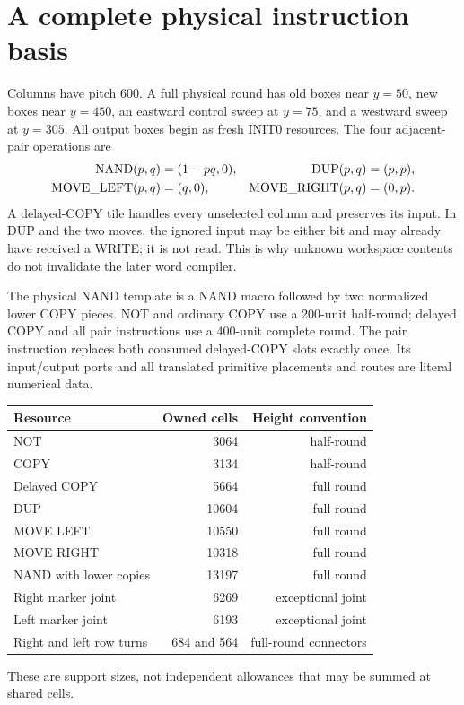 \documentclass[11pt,letterpaper]{article}
\theoremstyle{definition}\newtheorem{definition}[theorem]{Definition}
\theoremstyle{remark}\newtheorem{remark}[theorem]{Remark}
\newcommand{\DUP}{\operatorname{DUP}}\newcommand{\ML}{\operatorname{MOVE\_LEFT}}
\newcommand{\MR}{\operatorname{MOVE\_RIGHT}}\newcommand{\COPY}{\operatorname{COPY}}
\begin{document}
\section{A complete physical instruction basis}\label{ptr:la:sec:instructions}
Columns have pitch 600. A full physical round has old boxes near $y=50$, new boxes near $y=450$, an eastward control sweep at $y=75$, and a westward sweep at $y=305$. All output boxes begin as fresh INIT0 resources. The four adjacent-pair operations are
\begin{align}
 \NAND(p,q)&=(1-pq,0),&\DUP(p,q)&=(p,p),\label{ptr:la:eq:pair}\\
 \ML(p,q)&=(q,0),&\MR(p,q)&=(0,p).\nonumber
\end{align}
A delayed-COPY tile handles every unselected column and preserves its input. In DUP and the two moves, the ignored input may be either bit and may already have received a WRITE; it is not read. This is why unknown workspace contents do not invalidate the later word compiler.

The physical NAND template is a NAND macro followed by two normalized lower COPY pieces. NOT and ordinary COPY use a 200-unit half-round; delayed COPY and all pair instructions use a 400-unit complete round. The pair instruction replaces both consumed delayed-COPY slots exactly once. Its input/output ports and all translated primitive placements and routes are literal numerical data.

\begin{center}
\begin{tabular}{lrr}
\toprule
Resource & Owned cells & Height convention\\\midrule
NOT & 3064 & half-round\\
COPY & 3134 & half-round\\
Delayed COPY & 5664 & full round\\
DUP & 10604 & full round\\
MOVE LEFT & 10550 & full round\\
MOVE RIGHT & 10318 & full round\\
NAND with lower copies & 13197 & full round\\
Right marker joint & 6269 & exceptional joint\\
Left marker joint & 6193 & exceptional joint\\
Right and left row turns & 684 and 564 & full-round connectors\\\bottomrule
\end{tabular}
\end{center}
These are support sizes, not independent allowances that may be summed at shared cells.
\end{document}
